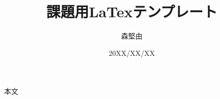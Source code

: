 \documentclass{ltjsarticle}
\begin{document}
\title{課題用LaTexテンプレート}
\author{森堅由}
\date{20XX/XX/XX}
\maketitle

本文
\begin{flushleft}
\end{flushleft}
\end{document}
